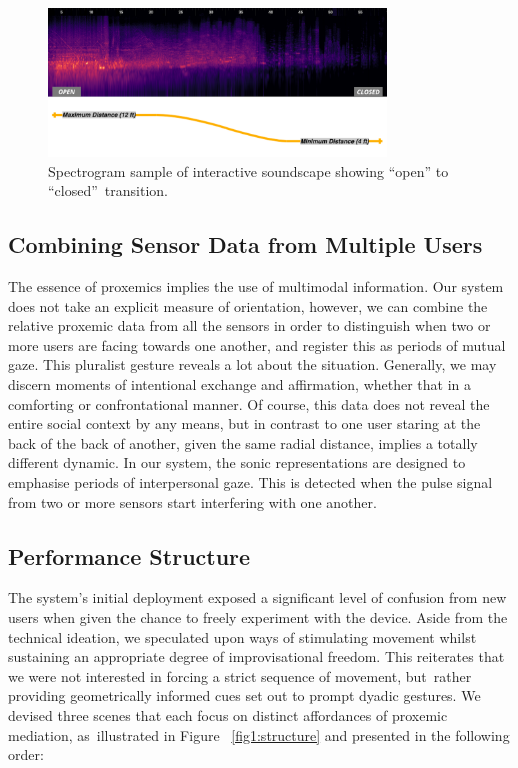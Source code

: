 \begin{figure}[!h]
\captionsetup{width=1.0\textwidth}
\centering
\includegraphics[width=0.8\textwidth,keepaspectratio]{Chapters/Figures/adse_ess/open_closed_examples_annotated_landscape_line_cont.png}
{\caption[Spectrogram sample of interactive soundscape]{Spectrogram sample of interactive soundscape showing ``open'' to ``closed''~transition.}
\label{fig:sound_examples}}
\end{figure}

\subsection*{Combining Sensor Data from Multiple Users}

The essence of proxemics implies the use of multimodal information. Our system does not take an explicit measure of orientation, however, we can combine the relative proxemic data from all the sensors in order to distinguish when two or more users are facing towards one another, and register this as periods of mutual gaze. This pluralist gesture reveals a lot about the situation. Generally, we may discern moments of intentional exchange and affirmation, whether that in a comforting or confrontational manner. Of course, this data does not reveal the entire social context by any means, but in contrast to one user staring at the back of the back of another, given the same radial distance, implies a totally different dynamic. In our system, the sonic representations are designed to emphasise periods of interpersonal gaze. This is detected when the pulse signal from two or more sensors start interfering with one another.

\subsection*{Performance Structure}
\label{sec:structure}

The system's initial deployment exposed a significant level of confusion from new users when given the chance to freely experiment with the device. Aside from the technical ideation, we speculated upon ways of stimulating movement whilst sustaining an appropriate degree of improvisational freedom. This reiterates that we were not interested in forcing a strict sequence of movement, but~rather providing geometrically informed cues set out to prompt dyadic gestures. We devised three scenes that each focus on distinct affordances of proxemic mediation, as~illustrated in Figure %
~\ref{fig1:structure} and presented in the following order:


